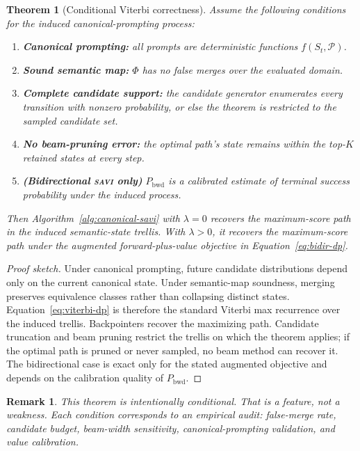 \documentclass[11pt,letterpaper]{article}
\newtheorem{theorem}{Theorem}
\newtheorem{remark}{Remark}
\newcommand{\Phifn}{\Phi}
\newcommand{\Pbwd}{P_{\mathrm{bwd}}}
\newcommand{\calP}{\mathcal{P}}
\newcommand{\SAVI}{\textsc{savi}\xspace}
\begin{document}
\begin{theorem}[Conditional Viterbi correctness]
\label{thm:conditional-correctness}
Assume the following conditions for the induced canonical-prompting process:
\begin{enumerate}[label=(\roman*)]
  \item \textbf{Canonical prompting:} all prompts are deterministic functions $f(S_t, \calP)$.
  \item \textbf{Sound semantic map:} $\Phifn$ has no false merges over the evaluated domain.
  \item \textbf{Complete candidate support:} the candidate generator enumerates every transition with
        nonzero probability, or else the theorem is restricted to the sampled candidate set.
  \item \textbf{No beam-pruning error:} the optimal path's state remains within the top-$K$ retained
        states at every step.
  \item \textbf{(Bidirectional \SAVI only)} $\Pbwd$ is a calibrated estimate of terminal success
        probability under the induced process.
\end{enumerate}
Then Algorithm~\ref{alg:canonical-savi} with $\lambda = 0$ recovers the maximum-score path in the
induced semantic-state trellis.
With $\lambda > 0$, it recovers the maximum-score path under the augmented forward-plus-value
objective in Equation~\eqref{eq:bidir-dp}.
\end{theorem}

\begin{proof}[Proof sketch]
Under canonical prompting, future candidate distributions depend only on the current canonical state.
Under semantic-map soundness, merging preserves equivalence classes rather than collapsing distinct
states.
Equation~\eqref{eq:viterbi-dp} is therefore the standard Viterbi max recurrence over the induced
trellis.
Backpointers recover the maximizing path.
Candidate truncation and beam pruning restrict the trellis on which the theorem applies; if the
optimal path is pruned or never sampled, no beam method can recover it.
The bidirectional case is exact only for the stated augmented objective and depends on the calibration
quality of $\Pbwd$.
\end{proof}

\begin{remark}
This theorem is intentionally conditional.
That is a feature, not a weakness.
Each condition corresponds to an empirical audit: false-merge rate, candidate budget, beam-width
sensitivity, canonical-prompting validation, and value calibration.
\end{remark}
\end{document}
